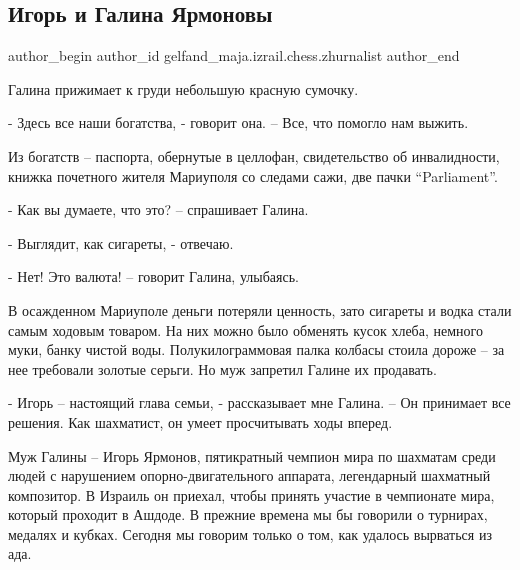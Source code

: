  
 
 
 
 

\subsection{Игорь и Галина Ярмоновы}
\label{sec:15_05_2022.fb.gelfand_maja.izrail.chess.zhurnalist.1.igor_i_galina_yarmon}

\ifcmt
 author_begin
   author_id gelfand_maja.izrail.chess.zhurnalist
 author_end
\fi

Галина прижимает к груди небольшую красную сумочку. 

- Здесь все наши богатства, - говорит она. – Все, что помогло нам выжить.

Из богатств – паспорта, обернутые в целлофан, свидетельство об инвалидности,
книжка почетного жителя Мариуполя со следами сажи, две пачки \enquote{Parliament}.

- Как вы думаете, что это? – спрашивает Галина.

- Выглядит, как сигареты, - отвечаю.

- Нет! Это валюта! – говорит Галина, улыбаясь.

В осажденном Мариуполе деньги потеряли ценность, зато сигареты и водка стали
самым ходовым товаром. На них можно было обменять кусок хлеба, немного муки,
банку чистой воды. Полукилограммовая палка колбасы стоила дороже – за нее
требовали золотые серьги. Но муж запретил Галине их продавать. 

- Игорь – настоящий глава семьи, - рассказывает мне Галина. – Он принимает все
решения. Как шахматист, он умеет просчитывать ходы вперед.

Муж Галины – Игорь Ярмонов, пятикратный чемпион мира по шахматам среди людей с
нарушением опорно-двигательного аппарата, легендарный шахматный композитор. В
Израиль он приехал, чтобы принять участие в чемпионате мира, который проходит в
Ашдоде. В прежние времена мы бы говорили о турнирах, медалях и кубках. Сегодня
мы говорим только о том, как удалось вырваться из ада.

